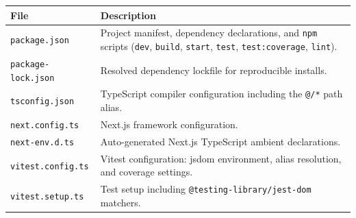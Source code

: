 \begin{center}
\small
\begin{tabular}{@{}P{4.6cm}P{9.0cm}@{}}
\hline
\textbf{File} & \textbf{Description} \\
\hline
\texttt{package.json} & Project manifest, dependency declarations, and \texttt{npm} scripts (\texttt{dev}, \texttt{build}, \texttt{start}, \texttt{test}, \texttt{test:coverage}, \texttt{lint}). \\
\texttt{package-lock.json} & Resolved dependency lockfile for reproducible installs. \\
\texttt{tsconfig.json} & TypeScript compiler configuration including the \texttt{@/*} path alias. \\
\texttt{next.config.ts} & Next.js framework configuration. \\
\texttt{next-env.d.ts} & Auto-generated Next.js TypeScript ambient declarations. \\
\texttt{vitest.config.ts} & Vitest configuration: jsdom environment, alias resolution, and coverage settings. \\
\texttt{vitest.setup.ts} & Test setup including \texttt{@testing-library/jest-dom} matchers. \\
\hline
\end{tabular}
\end{center}

